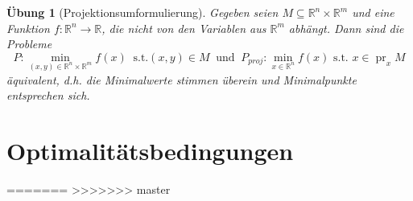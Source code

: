 \documentclass[11pt]{scrreprt}
\newcounter{thm}
\numberwithin{thm}{section}
\newtheorem{uebung}[thm]{Übung}
\newtheorem{uebung}[thm]{Übung}
\begin{document}
\begin{uebung}[Projektionsumformulierung]
	Gegeben seien $M \subseteq \mathbb{R}^n \times \mathbb{R}^m$ und eine Funktion $f \colon \mathbb{R}^n \rightarrow \mathbb{R}$, die nicht von den Variablen aus $\mathbb{R}^m$ abhängt. Dann sind die Probleme 
	$$ P \colon \min_{(x, y) \in \mathbb{R}^n \times \mathbb{R}^m} f(x) ~\text{ s.t.} (x, y) \in M ~\text{ und } ~ P_{proj} \colon \min_{x \in \mathbb{R}^n} f(x) \text{ s.t. } x \in \operatorname{pr}_x M $$
	äquivalent, d.h. die Minimalwerte stimmen überein und Minimalpunkte entsprechen sich.
\end{uebung}

\setcounter{chapter}{2}
\setcounter{section}{0}

\newpage

\section{Optimalitätsbedingungen}

=======
>>>>>>> master
\end{document}
